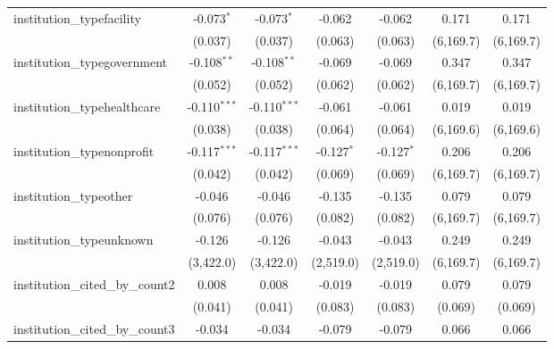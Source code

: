 \begin{tabular}{lcccccc}
   institution\_typefacility             & -0.073$^{*}$   & -0.073$^{*}$   & -0.062        & -0.062        & 0.171          & 0.171\\   
                                         & (0.037)        & (0.037)        & (0.063)       & (0.063)       & (6,169.7)      & (6,169.7)\\   
   institution\_typegovernment           & -0.108$^{**}$  & -0.108$^{**}$  & -0.069        & -0.069        & 0.347          & 0.347\\   
                                         & (0.052)        & (0.052)        & (0.062)       & (0.062)       & (6,169.7)      & (6,169.7)\\   
   institution\_typehealthcare           & -0.110$^{***}$ & -0.110$^{***}$ & -0.061        & -0.061        & 0.019          & 0.019\\   
                                         & (0.038)        & (0.038)        & (0.064)       & (0.064)       & (6,169.6)      & (6,169.6)\\   
   institution\_typenonprofit            & -0.117$^{***}$ & -0.117$^{***}$ & -0.127$^{*}$  & -0.127$^{*}$  & 0.206          & 0.206\\   
                                         & (0.042)        & (0.042)        & (0.069)       & (0.069)       & (6,169.7)      & (6,169.7)\\   
   institution\_typeother                & -0.046         & -0.046         & -0.135        & -0.135        & 0.079          & 0.079\\   
                                         & (0.076)        & (0.076)        & (0.082)       & (0.082)       & (6,169.7)      & (6,169.7)\\   
   institution\_typeunknown              & -0.126         & -0.126         & -0.043        & -0.043        & 0.249          & 0.249\\   
                                         & (3,422.0)      & (3,422.0)      & (2,519.0)     & (2,519.0)     & (6,169.7)      & (6,169.7)\\   
   institution\_cited\_by\_count2        & 0.008          & 0.008          & -0.019        & -0.019        & 0.079          & 0.079\\   
                                         & (0.041)        & (0.041)        & (0.083)       & (0.083)       & (0.069)        & (0.069)\\   
   institution\_cited\_by\_count3        & -0.034         & -0.034         & -0.079        & -0.079        & 0.066          & 0.066\\   

\end{tabular}
